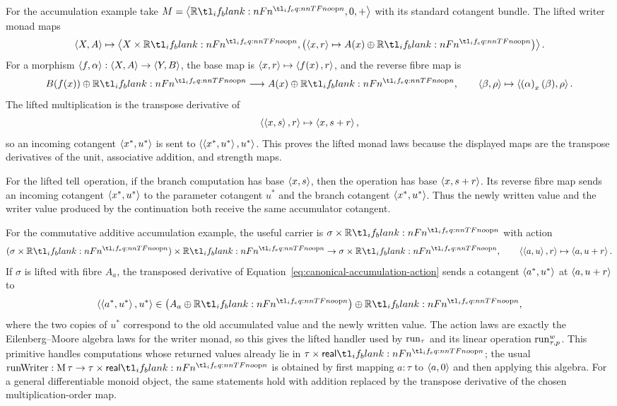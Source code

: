 \documentclass[11pt,a4paper]{article}
\theoremstyle{definition}
\theoremstyle{remark}
\begin{document}
For the accumulation example take \(M=\tuple{\R[n],0,+}\) with its standard
cotangent bundle.  The lifted writer monad maps
\[
  \tuple{X,A}
  \mapsto
  \tuple{
    X\times\R[n],
    \left(\tuple{x,r}\mapsto \Fun[nn]{A}{x}\oplus\R[n]\right)
  }.
\]
For a morphism \(\left\langle f,\alpha\right\rangle:\left\langle X,A\right\rangle\to\left\langle Y,B\right\rangle\), the base map is
\(\tuple{x,r}\mapsto\tuple{\fn[n]{f}{x},r}\), and the reverse fibre map is
\[
  \Fun[np]{B}{\fn[n]{f}{x}}\oplus\R[n]
  \longrightarrow
  \Fun[nn]{A}{x}\oplus\R[n],
  \qquad
  \tuple{\beta,\rho}\mapsto\tuple{\Nat[nn]{\alpha}{x}(\beta),\rho}.
\]
The lifted multiplication is the transpose derivative of
\[
  \left\langle \left\langle x,s\right\rangle,r\right\rangle\mapsto\left\langle x,s+r\right\rangle,
\]
so an incoming cotangent \(\left\langle x^{\ast},u^{\ast}\right\rangle\) is sent to
\(\left\langle \left\langle x^{\ast},u^{\ast}\right\rangle,u^{\ast}\right\rangle\).  This proves the lifted monad
laws because the displayed maps are the transpose derivatives of the unit,
associative addition, and strength maps.

For the lifted \(\opn{tell}\) operation, if the branch computation has base
\(\left\langle x,s\right\rangle\), then the operation has base \(\left\langle x,s+r\right\rangle\).  Its reverse
fibre map sends an incoming cotangent \(\left\langle x^{\ast},u^{\ast}\right\rangle\) to the
parameter cotangent \(u^{\ast}\) and the branch cotangent
\(\left\langle x^{\ast},u^{\ast}\right\rangle\).  Thus the newly written value and the writer value
produced by the continuation both receive the same accumulator cotangent.

For the commutative additive accumulation example, the useful carrier is
\(\sigma\times\R[n]\) with action
\begin{equation}
  \label{eq:canonical-accumulation-action}
  (\sigma\times\R[n])\times\R[n]
  \to
  \sigma\times\R[n],
  \qquad
  \tuple{\tuple{a,u},r}\mapsto\tuple{a,u+r}.
\end{equation}
If \(\sigma\) is lifted with fibre \(A_a\), the transposed derivative of
Equation~\eqref{eq:canonical-accumulation-action} sends a cotangent
\(\left\langle a^{\ast},u^{\ast}\right\rangle\) at \(\left\langle a,u+r\right\rangle\) to
\[
  \tuple{\tuple{a^{\ast},u^{\ast}},u^{\ast}}
  \in
  \left(A_a\oplus\R[n]\right)\oplus\R[n],
\]
where the two copies of \(u^{\ast}\) correspond to the old accumulated value and
the newly written value.  The action laws are exactly the
Eilenberg--Moore algebra laws for the writer monad, so this gives the lifted
handler used by \(\opn[b]{run}_{\tau}\) and its linear operation
\(\opn[b]{run}^{w}_{\tau,p}\).  This primitive handles computations whose
returned values already lie in \(\tau\times\srcreal[n]\); the usual
\(\opn{runWriter}:\opn[b]{M}\tau\to\tau\times\srcreal[n]\) is obtained by
first mapping \(a:\tau\) to \(\left\langle a,0\right\rangle\) and then applying this algebra.
For a general differentiable monoid object, the same statements hold with
addition replaced by the transpose derivative of the chosen multiplication-order
map.
\end{document}
